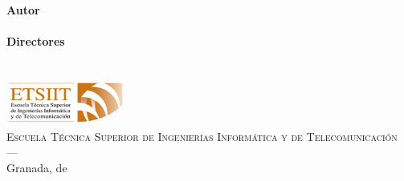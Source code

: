 \begin{titlepage}
\begin{minipage}{\textwidth}
\textbf{Autor}\\ \tfgauthorname \\[2.5ex]
\textbf{Directores}\\
{\tfgtutornameA\\
\tfgtutornameB}\\[1cm]
\includegraphics[width=0.3\textwidth]{01.Estructura/02.Portada/00.Figuras/02.etsiit_logo.png}\\[0.1cm]
\textsc{Escuela Técnica Superior de Ingenierías Informática y de Telecomunicación}\\
\textsc{---}\\
Granada, \tfgmes{} de \tfganno
\end{minipage}

\end{titlepage}






